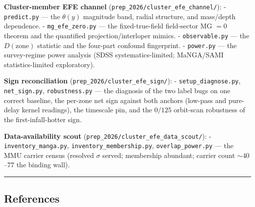 \documentclass[
]{article}
\begin{document}
\textbf{Cluster-member EFE channel}
(\texttt{prep\_2026/cluster\_efe\_channel/}): - \texttt{predict.py} ---
the \(\theta(y)\) magnitude band, radial structure, and mass/depth
dependence. - \texttt{mg\_efe\_zero.py} --- the fixed-true-field
field-sector MG \(=0\) theorem and the quantified projection/interloper
mimics. - \texttt{observable.py} --- the \(D(\text{zone})\) statistic
and the four-part confound fingerprint. - \texttt{power.py} --- the
survey-regime power analysis (SDSS systematics-limited; MaNGA/SAMI
statistics-limited exploratory).

\textbf{Sign reconciliation} (\texttt{prep\_2026/cluster\_efe\_sign/}):
- \texttt{setup\_diagnose.py}, \texttt{net\_sign.py},
\texttt{robustness.py} --- the diagnosis of the two label bugs on one
correct baseline, the per-zone net sign against both anchors (low-pass
and pure-delay kernel readings), the timescale pin, and the \(0/125\)
orbit-scan robustness of the first-infall-hotter sign.

\textbf{Data-availability scout}
(\texttt{prep\_2026/cluster\_efe\_data\_scout/}): -
\texttt{inventory\_manga.py}, \texttt{inventory\_membership.py},
\texttt{overlap\_power.py} --- the MMU carrier census (resolved
\(\sigma\) served; membership abundant; carrier count \(\sim40\)--\(77\)
the binding wall).

\begin{center}\rule{0.5\linewidth}{0.5pt}\end{center}

\subsection{References}\label{references}
\end{document}
